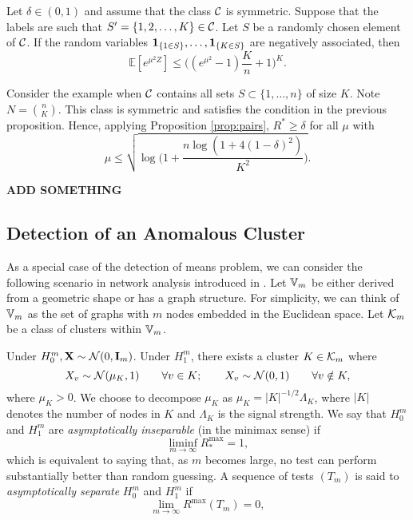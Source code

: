 \documentclass[10pt, oneside]{article}
\begin{document}
\begin{prop}
  \label{negass}
  Let $\delta\in(0,1)$ and assume that the class ${\mathcal C}$ is symmetric. Suppose that the labels are such that $S'=\{1,2,\ldots,K\} \in{\mathcal C}$. Let $S$ be a randomly chosen element of ${\mathcal C}$. If the random variables
  ${\bf 1}_{\{ 1 \in S \}},\ldots,{\bf 1}_{\{ K\in S \}}$ are negatively associated, then 
  $$\mathbb{E}[ e^{\mu^2 Z}]\le \biggl( (e^{\mu^2} -1 ) \frac{K}{n} +1 \biggr)^K.$$
\end{prop}
\begin{exmp}
  Consider the example when ${\mathcal C}$ contains all sets $S \subset\{1,\ldots ,n\}$ of size $K$. Note $N={n\choose K}$. This class is symmetric and satisfies the condition in the previous proposition. Hence, applying Proposition \ref{prop:pairs}, $R^*\ge\delta$ for all $\mu$ with
  \[
  \mu\le\sqrt{\log\biggl(1+\frac{n\log(1+4(1-\delta)^2)}{K^2} \biggr)}.
  \]
\end{exmp}
{\bf ADD SOMETHING}


\subsection{Detection of an Anomalous Cluster}
As a special case of the detection of means problem, we can consider the following scenario in network analysis introduced in \cite{arias2011detection}.
Let $\mathbb V_m$ be either derived from a geometric shape or has a graph structure. For simplicity, we can think of $\mathbb V_m$ as the set of graphs with $m$ nodes embedded in the Euclidean space. Let ${\mathcal K}_m$ be a class of clusters within $\mathbb V_m$.

Under $H_0^m, \mathbf{X} \sim {\mathcal N}(0, \mathbf{I}_m)$. Under $H_1^m$, there exists a cluster $K \in {\mathcal K}_m$ where 
%
\[
X_v \sim{\mathcal N}(\mu_K,1)\qquad \forall v \in K;\qquad X_v \sim
{\mathcal N}(0,1)\qquad \forall v \notin K,
\]
%
where $\mu_K > 0$.
We choose to decompose $\mu_K$ as $\mu_K = |K|^{-1/2} \Lambda_K$, where
$|K|$ denotes the number of nodes in $K$ and $\Lambda_K$ is the signal
strength. We say that $H_0^m$ and $H_1^m$ are {\it asymptotically inseparable}
(in the minimax sense) if
%
\[
\liminf_{m \to\infty} R_{*}^{\max} = 1,
\]
%
which is equivalent to saying that, as $m$ becomes large, no test can
perform substantially better than random guessing. A sequence of tests $(T_m)$ is said to {\it asymptotically separate} $H
_0^m$ and $H_1^m$ if
%
\[
\lim_{m \to\infty} R^{\max}(T_m) = 0,
\]
\end{document}

